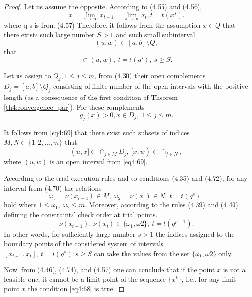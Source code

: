 \documentclass[graybox]{svmult}
\begin{document}
\begin{proof}
  Let us assume the opposite. According to (4.55) and (4.56),
  \begin{displaymath}
    \overline x = \lim_{s\to\infty}x_{t-1}=\lim_{s\to\infty}x_t, t=t(x^s).
  \end{displaymath}
  where q s is from (4.57) Therefore, it follows from the assumption $x\in Q$ that there exists such large number $S>1$ and such small subinterval
  \begin{equation}
    \label{eq4:69}
    (u,w)\subset[a,b]\setminus Q,
  \end{equation}
  that
  \begin{equation}
    [x_{t-1},x_t]\subset(u,w),\:t=t(q^s),\:s\ge S.
  \end{equation}

  Let us assign to $Q_j, 1\le j\le m$, from (4.30) their open complements $D_j=[a,b]\setminus Q_j$ consisting of finite number of the open intervals with the positive length (as a consequence of the first condition of Theorem \ref{th4:convergence_par}). For these complements
  \begin{equation}
    g_j(x)>0,x\in D_j,\:1\le j\le m.
  \end{equation}

  It follows from \eqref{eq4:69} that there exist such subsets of indices $M,N\subset\{1,2,\dots,m\}$ that
  \begin{equation}
    (u,\overline x]\subset \cap_{j\in M}D_j,\:[\overline x,w)\subset \cap_{j\in N},
  \end{equation}
  where $(u,w)$ is an open interval from \eqref{eq4:69}.

  According to the trial execution rules and to conditions (4.35) and (4.72), for any interval from (4.70) the relations
  \begin{displaymath}
    \omega_1=\nu(x_{t-1})\in M,\: \omega_2=\nu(x_t)\in N,\:t=t(q^s),
  \end{displaymath}
  hold where $1\le \omega_1,\: \omega_2\le m$. Moreover, according to the rules (4.39) and (4.40) defining the constraints’ check order at trial points,
  \begin{displaymath}
    \nu(x_{t-1}),\:\nu(x_t)\in\{\omega_1,\omega2\},\: t=t(q^{p+1}).
  \end{displaymath}
  In other words, for sufficiently large number $s>1$ the indices assigned to the boundary points of the considered system of intervals $[x_{t-1},x_t],\: t=t(q^s ): s\ge S$ can take the values from the set $\{\omega_1,\omega2\}$ only.

  Now, from (4.46), (4.74), and (4.57) one can conclude that if the point $x$ is not a feasible one, it cannot be a limit point of the sequence $\{x^k\}$, i.e., for any limit point $x$ the condition \eqref{eq4:68} is true.
\end{proof}
\end{document}
